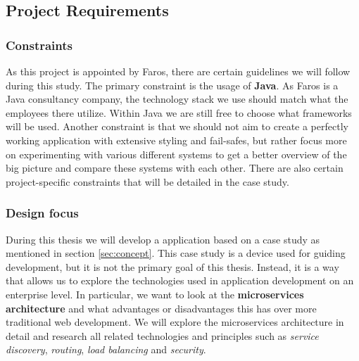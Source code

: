\documentclass[12pt]{article}
\begin{document}
\begin{multicols}{2}
\subsection{Project Requirements}
\subsubsection{Constraints}\label{sec:constraints}
As this project is appointed by Faros, there are certain guidelines we will follow during this study. The primary constraint is the usage of \textbf{Java}. As Faros is a Java consultancy company, the technology stack we use should match what the employees there utilize. Within Java we are still free to choose what frameworks will be used. Another constraint is that we should not aim to create a perfectly working application with extensive styling and fail-safes, but rather focus more on experimenting with various different systems to get a better overview of the big picture and compare these systems with each other. There are also certain project-specific constraints that will be detailed in the case study.
\subsubsection{Design focus}
During this thesis we will develop a application based on a case study as mentioned in section \ref{sec:concept}. This case study is a device used for guiding development, but it is not the primary goal of this thesis. Instead, it is a way that allows us to explore the technologies used in application development on an enterprise level. In particular, we want to look at the \textbf{microservices architecture} and what advantages or disadvantages this has over more traditional web development. We will explore the microservices architecture in detail and research all related technologies and principles such as \textit{service discovery}, \textit{routing}, \textit{load balancing} and \textit{security}.

\end{multicols}

\end{document}
